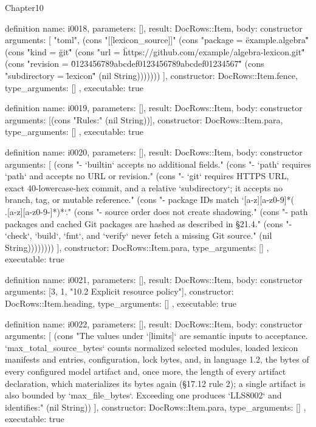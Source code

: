 \begin{lexlean}{Chapter10}
\begin{semanticmodule}
definition{
  name: i0018,
  parameters: [],
  result: DocRows::Item,
  body: constructor{
    arguments: [
      "toml",
      (cons "[[lexicon_source]]" (cons "package = \"example.algebra\"" (cons "kind = \"git\"" (cons "url = \"https://github.com/example/algebra-lexicon.git\"" (cons "revision = \"0123456789abcdef0123456789abcdef01234567\"" (cons "subdirectory = \"lexicon\"" (nil String)))))))
    ],
    constructor: DocRows::Item.fence,
    type_arguments: []
  },
  executable: true
}

definition{
  name: i0019,
  parameters: [],
  result: DocRows::Item,
  body: constructor{
    arguments: [(cons "Rules:" (nil String))],
    constructor: DocRows::Item.para,
    type_arguments: []
  },
  executable: true
}

definition{
  name: i0020,
  parameters: [],
  result: DocRows::Item,
  body: constructor{
    arguments: [
      (cons "- `builtin` accepts no additional fields." (cons "- `path` requires `path` and accepts no URL or revision." (cons "- `git` requires HTTPS URL, exact 40-lowercase-hex commit, and a relative `subdirectory`; it accepts no branch, tag, or mutable reference." (cons "- package IDs match `[a-z][a-z0-9]*(\\.[a-z][a-z0-9-]*)*`." (cons "- source order does not create shadowing." (cons "- path packages and cached Git packages are hashed as described in §21.4." (cons "- `check`, `build`, `fmt`, and `verify` never fetch a missing Git source." (nil String))))))))
    ],
    constructor: DocRows::Item.para,
    type_arguments: []
  },
  executable: true
}

definition{
  name: i0021,
  parameters: [],
  result: DocRows::Item,
  body: constructor{
    arguments: [3, 1, "10.2 Explicit resource policy"],
    constructor: DocRows::Item.heading,
    type_arguments: []
  },
  executable: true
}

definition{
  name: i0022,
  parameters: [],
  result: DocRows::Item,
  body: constructor{
    arguments: [
      (cons "The values under `[limits]` are semantic inputs to acceptance. `max_total_source_bytes` counts normalized selected modules, loaded lexicon manifests and entries, configuration, lock bytes, and, in language 1.2, the bytes of every configured model artifact and, once more, the length of every artifact declaration, which materializes its bytes again (§17.12 rule 2); a single artifact is also bounded by `max_file_bytes`. Exceeding one produces `LLS8002` and identifies:" (nil String))
    ],
    constructor: DocRows::Item.para,
    type_arguments: []
  },
  executable: true
}


\end{semanticmodule}
\end{lexlean}
